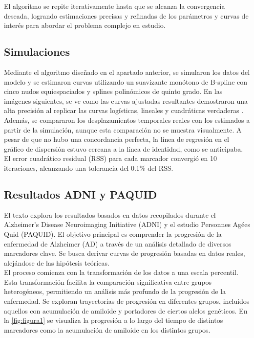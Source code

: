 \documentclass[12pt]{article}
\begin{document}
El algoritmo se repite iterativamente hasta que se alcanza la convergencia deseada, logrando estimaciones precisas y refinadas de los parámetros y curvas de interés para abordar el problema complejo en estudio.
		
\subsection{Simulaciones}
Mediante el algoritmo diseñado en el apartado anterior, se simularon los datos del modelo y se estimaron curvas utilizando un suavizante monótono de B-spline con cinco nudos equiespaciados y splines polinómicos de quinto grado. En las imágenes siguientes, se ve como las curvas ajustadas resultantes demostraron una alta precisión al replicar las curvas logísticas, lineales y cuadráticas verdaderas .\\

Además, se compararon los desplazamientos temporales reales con los estimados a partir de la simulación, aunque esta comparación no se muestra visualmente. A pesar de que no hubo una concordancia perfecta, la línea de regresión en el gráfico de dispersión estuvo cercana a la línea de identidad, como se anticipaba. El error cuadrático residual (RSS) para cada marcador convergió en 10 iteraciones, alcanzando una tolerancia del 0.1\% del RSS.

\subsection{Resultados ADNI y PAQUID}

El texto explora los resultados basados en datos recopilados durante el Alzheimer's Disease Neuroimaging Initiative (ADNI) y el estudio Personnes Agées Quid (PAQUID). El objetivo principal es comprender la progresión de la enfermedad de Alzheimer (AD) a través de un análisis detallado de diversos marcadores clave. Se busca derivar curvas de progresión basadas en datos reales, alejándose de las hipótesis teóricas.\\

El proceso comienza con la transformación de los datos a una escala percentil. Esta transformación facilita la comparación significativa entre grupos heterogéneos, permitiendo un análisis más profundo de la progresión de la enfermedad. Se exploran trayectorias de progresión en diferentes grupos, incluidos aquellos con acumulación de amiloide y portadores de ciertos alelos genéticos. En la \ref{fig:figura1} se visualiza la progresión a lo largo del tiempo de distintos marcadores como la acumulación de amiloide en los distintos grupos.\\
\end{document}
